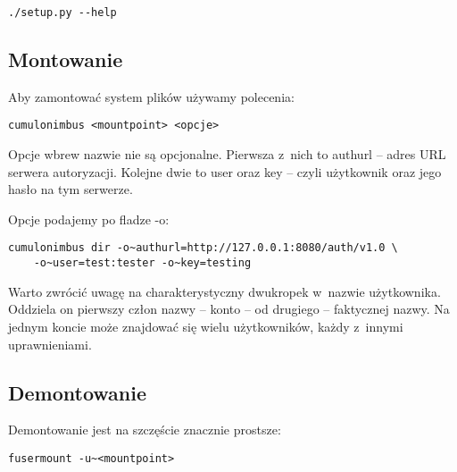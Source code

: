 \begin{verbatim}
./setup.py --help
\end{verbatim}

\subsection{Montowanie}

Aby zamontować system plików używamy polecenia:

\begin{verbatim}
cumulonimbus <mountpoint> <opcje>
\end{verbatim}

Opcje wbrew nazwie nie są opcjonalne. Pierwsza z~nich to authurl -- adres URL
serwera autoryzacji. Kolejne dwie to user oraz key -- czyli użytkownik oraz
jego hasło na tym serwerze.

Opcje podajemy po fladze -o:

\begin{verbatim}
cumulonimbus dir -o~authurl=http://127.0.0.1:8080/auth/v1.0 \
    -o~user=test:tester -o~key=testing
\end{verbatim}

Warto zwrócić uwagę na charakterystyczny dwukropek w~nazwie użytkownika.
Oddziela on pierwszy człon nazwy -- konto -- od drugiego -- faktycznej nazwy.
Na jednym koncie może znajdować się wielu użytkowników, każdy z~innymi
uprawnieniami.

\subsection{Demontowanie}

Demontowanie jest na szczęście znacznie prostsze:

\begin{verbatim}
fusermount -u~<mountpoint>
\end{verbatim}





